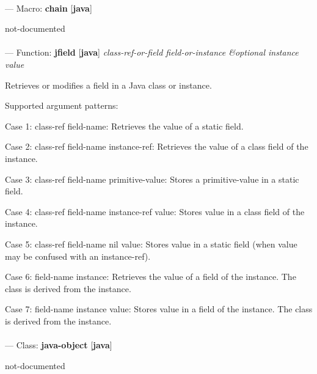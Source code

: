 \paragraph{}
\label{JAVA:CHAIN}
--- Macro: \textbf{chain} [\textbf{java}] \textit{}

\begin{adjustwidth}{5em}{5em}
not-documented
\end{adjustwidth}

\paragraph{}
\label{JAVA:JFIELD}
--- Function: \textbf{jfield} [\textbf{java}] \textit{class-ref-or-field field-or-instance \&optional instance value}

\begin{adjustwidth}{5em}{5em}
Retrieves or modifies a field in a Java class or instance.

Supported argument patterns:

   Case 1: class-ref  field-name:
      Retrieves the value of a static field.

   Case 2: class-ref  field-name  instance-ref:
      Retrieves the value of a class field of the instance.

   Case 3: class-ref  field-name  primitive-value:
      Stores a primitive-value in a static field.

   Case 4: class-ref  field-name  instance-ref  value:
      Stores value in a class field of the instance.

   Case 5: class-ref  field-name  nil  value:
      Stores value in a static field (when value may be
      confused with an instance-ref).

   Case 6: field-name  instance:
      Retrieves the value of a field of the instance. The
      class is derived from the instance.

   Case 7: field-name  instance  value:
      Stores value in a field of the instance. The class is
      derived from the instance.


\end{adjustwidth}

\paragraph{}
\label{JAVA:JAVA-OBJECT}
--- Class: \textbf{java-object} [\textbf{java}] \textit{}

\begin{adjustwidth}{5em}{5em}
not-documented
\end{adjustwidth}

